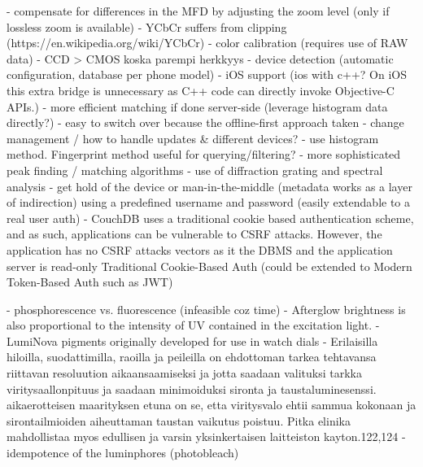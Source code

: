 \documentclass[thesis.tex]{subfiles}
\begin{document}
- compensate for differences in the MFD by adjusting the zoom level (only if lossless zoom is available)
- YCbCr suffers from clipping (https://en.wikipedia.org/wiki/YCbCr)
- color calibration (requires use of RAW data)
  - CCD > CMOS koska parempi herkkyys
- device detection (automatic configuration, database per phone model)
- iOS support (ios with c++? On iOS this extra bridge is unnecessary as C++ code can directly invoke Objective-C APIs.)
- more efficient matching if done server-side (leverage histogram data directly?)
  - easy to switch over because the offline-first approach taken
- change management / how to handle updates \& different devices?
- use histogram method. Fingerprint method useful for querying/filtering?
- more sophisticated peak finding / matching algorithms
- use of diffraction grating and spectral analysis
- get hold of the device or man-in-the-middle (metadata works as a layer of indirection)
using a predefined username and password (easily extendable to a real user auth)
- CouchDB uses a traditional cookie based authentication scheme, and as such, applications can be vulnerable to CSRF attacks. However, the application has no CSRF attacks vectors as it the DBMS and the application server is read-only
Traditional Cookie-Based Auth (could be extended to Modern Token-Based Auth such as JWT)

- phosphorescence vs. fluorescence (infeasible coz time)
- Afterglow brightness is also proportional to the intensity of UV contained in the excitation light.
- LumiNova pigments originally developed for use in watch dials
- Erilaisilla hiloilla, suodattimilla, raoilla ja peileilla on ehdottoman tarkea tehtavansa riittavan resoluution aikaansaamiseksi ja jotta saadaan valituksi tarkka viritysaallonpituus ja saadaan minimoiduksi sironta ja taustaluminesenssi. aikaerotteisen maarityksen etuna on se, etta viritysvalo ehtii sammua kokonaan ja sirontailmioiden aiheuttaman taustan vaikutus poistuu. Pitka elinika mahdollistaa myos edullisen ja varsin yksinkertaisen laitteiston kayton.122,124
- idempotence of the luminphores (photobleach)
\end{document}
